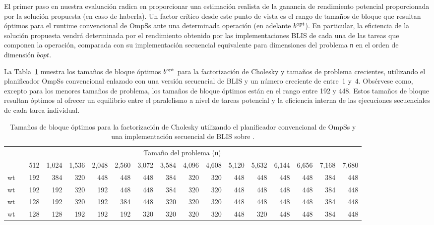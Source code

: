 \newcommand{\bopt}{b^{\mbox{\rm \scriptsize opt}}\xspace}

El primer paso en nuestra evaluación radica en proporcionar una estimación
realista de la ganancia de rendimiento potencial proporcionada por la
solución propuesta (en caso de haberla). Un factor crítico desde este punto
de vista es el rango de tamaños de bloque que resultan óptimos para el
runtime convencional de OmpSs ante una determinada operación (en adelante
$\bopt$). En particular, la eficiencia de la solución propuesta vendrá
determinada por el rendimiento obtenido por las implementaciones BLIS de
cada una de las tareas que componen la operación, comparada con su
implementación secuencial equivalente para dimensiones del problema {\tt n}
en el orden de dimensión $bopt$.

La Tabla~\ref{tab:optimal_bs_sym} muestra los tamaños de bloque óptimos
$\bopt$ para la factorización de Cholesky y tamaños de problema crecientes,
utilizando el planificador OmpSs convencional enlazado con una versión
secuencial de BLIS y un número creciente de \wts entre~1 y~4. Obsérvese
como, excepto para los menores tamaños de problema, los tamaños de bloque
óptimos están en el rango entre 192 y 448. Estos tamaños de bloque resultan
óptimos al ofrecer un equilibrio entre el paralelismo a nivel de tareas
potencial y la eficiencia interna de las ejecuciones secuenciales de cada
tarea individual.

\newcommand{\ra}[1]{\renewcommand{\arraystretch}{#1}}
\newcommand{\ca}[1]{\renewcommand{\tabcolsep}{#1}}

\ra{1.2}
\ca{2pt}

\begin{table}
	\centering
	\caption{Tamaños de bloque óptimos para la factorización de Cholesky utilizando el planificador convencional
	         de OmpSs y una implementación secuencial de BLIS sobre \odroid.}
	\label{tab:optimal_bs_sym}
{\scriptsize
\begin{tabular}{crrrrrrrrrrrrrrrr} 
\toprule
  & \phantom{a} & \multicolumn{14}{c}{Tamaño del problema ({\tt n})} \\ 
\cmidrule{3-17} 
  & \phantom{a} &     512 & 1,024 & 1,536 & 2,048 & 2,560 & 3,072 & 3,584 & 4,096 & 4,608 & 5,120 & 5,632 & 6,144 & 6,656 & 7,168 & 7,680 \\ \hline

{\sc 1 wt} & \phantom{a} &     192 & 384  & 320  & 448  & 448  & 448  & 384  & 320 & 320 & 448 & 448 & 448 & 448 & 384 & 448 \\ \hline
{\sc 2 wt} & \phantom{a} &     192 & 192  & 320  & 192  & 448  & 448  & 384  & 320 & 320 & 448 & 448 & 448 & 448 & 384 & 448 \\ \hline
{\sc 3 wt} & \phantom{a} &     128 & 192  & 320  & 192  & 384  & 448  & 320  & 320 & 320 & 448 & 448 & 448 & 448 & 384 & 448 \\ \hline
{\sc 4 wt} & \phantom{a} &     128 & 128  & 192  & 192  & 192  & 320  & 320  & 320 & 320 & 448 & 320 & 448 & 448 & 384 & 448 \\ \bottomrule
\end{tabular}
}
\end{table}

